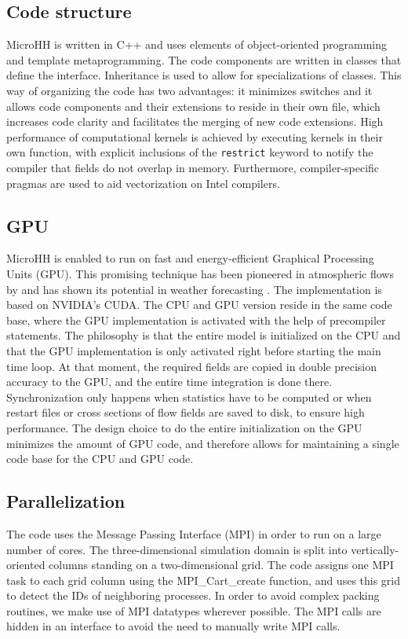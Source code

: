 \documentclass[gmd,manuscript]{copernicus}
\begin{document}
\subsection{Code structure}
MicroHH is written in C++ and uses elements of object-oriented programming and template metaprogramming. The code components are written in classes that define the interface. Inheritance is used to allow for specializations of classes. This way of organizing the code has two advantages: it minimizes switches and it allows code components and their extensions to reside in their own file, which increases code clarity and facilitates the merging of new code extensions. High performance of computational kernels is achieved by executing kernels in their own function, with explicit inclusions of the \texttt{restrict} keyword to notify the compiler that fields do not overlap in memory. Furthermore, compiler-specific pragmas are used to aid vectorization on Intel compilers.

\subsection{GPU}
MicroHH is enabled to run on fast and energy-efficient Graphical Processing Units (GPU). This promising technique has been pioneered in atmospheric flows by \citet{Schalkwijk2012} and has shown its potential in weather forecasting \citep{Schalkwijk2015}. The implementation is based on NVIDIA's CUDA. The CPU and GPU version reside in the same code base, where the GPU implementation is activated with the help of precompiler statements. The philosophy is that the entire model is initialized on the CPU and that the GPU implementation is only activated right before starting the main time loop.  At that moment, the required fields are copied in double precision accuracy to the GPU, and the entire time integration is done there. Synchronization only happens when statistics have to be computed or when restart files or cross sections of flow fields are saved to disk, to ensure high performance. The design choice to do the entire initialization on the GPU minimizes the amount of GPU code, and therefore allows for maintaining a single code base for the CPU and GPU code.

\subsection{Parallelization}
The code uses the Message Passing Interface (MPI) in order to run on a large number of cores. The three-dimensional simulation domain is split into vertically-oriented columns standing on a two-dimensional grid. The code assigns one MPI task to each grid column using the MPI\_Cart\_create function, and uses this grid to detect the IDs of neighboring processes. In order to avoid complex packing routines, we make use of MPI datatypes wherever possible. The MPI calls are hidden in an interface to avoid the need to manually write MPI calls.
\end{document}
